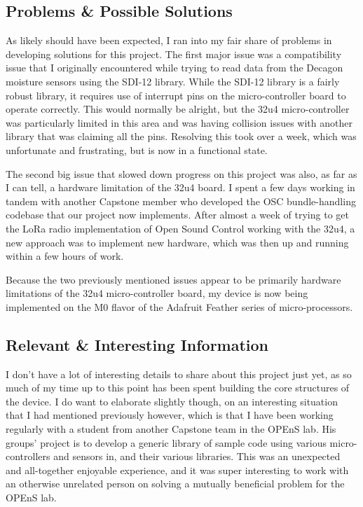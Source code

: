 \documentclass[onecolumn, draftclsnofoot,10pt, compsoc]{IEEEtran}
\begin{document}
    \subsection{Problems \& Possible Solutions}%
    As likely should have been expected, I ran into my fair share of problems in developing solutions for this project. The first major issue was a compatibility issue that I originally encountered while trying to read data from the Decagon moisture sensors using the SDI-12 library.
While the SDI-12 library is a fairly robust library, it requires use of interrupt pins on the micro-controller board to operate correctly.
This would normally be alright, but the 32u4 micro-controller was particularly limited in this area and was having collision issues with another library that was claiming all the pins. 
Resolving this took over a week, which was unfortunate and frustrating, but is now in a functional state.

The second big issue that slowed down progress on this project was also, as far as I can tell, a hardware limitation of the 32u4 board.
I spent a few days working in tandem with another Capstone member who developed the OSC bundle-handling codebase that our project now implements.
After almost a week of trying to get the LoRa radio implementation of Open Sound Control working with the 32u4, a new approach was to implement new hardware, which was then up and running within a few hours of work.

Because the two previously mentioned issues appear to be primarily hardware limitations of the 32u4 micro-controller board, my device is now being implemented on the M0 flavor of the Adafruit Feather series of micro-processors.

    \subsection{Relevant \& Interesting Information}%
    I don’t have a lot of interesting details to share about this project just yet, as so much of my time up to this point has been spent building the core structures of the device.
I do want to elaborate slightly though, on an interesting situation that I had mentioned  previously however, which is that I have been working regularly with a student from another Capstone team in the OPEnS lab.
His groups' project is to develop a generic library of sample code using various micro-controllers and sensors in, and their various libraries.
This was an unexpected and all-together enjoyable experience, and it was super interesting to work with an otherwise unrelated person on solving a mutually beneficial problem for the OPEnS lab. 
\end{document}

